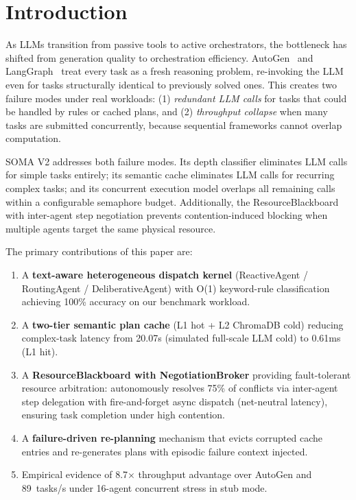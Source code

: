\documentclass[conference]{IEEEtran}
\begin{document}
\section{Introduction}

As LLMs transition from passive tools to active orchestrators, the bottleneck has shifted
from generation quality to orchestration efficiency. AutoGen~\cite{autogen} and
LangGraph~\cite{langgraph} treat every task as a fresh reasoning problem, re-invoking the
LLM even for tasks structurally identical to previously solved ones. This creates two
failure modes under real workloads: (1) \emph{redundant LLM calls} for tasks that could be
handled by rules or cached plans, and (2) \emph{throughput collapse} when many tasks are
submitted concurrently, because sequential frameworks cannot overlap computation.

SOMA V2 addresses both failure modes. Its depth classifier eliminates LLM calls for simple
tasks entirely; its semantic cache eliminates LLM calls for recurring complex tasks; and its
concurrent execution model overlaps all remaining calls within a configurable semaphore
budget. Additionally, the ResourceBlackboard with inter-agent step negotiation prevents
contention-induced blocking when multiple agents target the same physical resource.

The primary contributions of this paper are:
\begin{enumerate}
  \item A \textbf{text-aware heterogeneous dispatch kernel} (ReactiveAgent /
        RoutingAgent / DeliberativeAgent) with O(1) keyword-rule classification
        achieving 100\% accuracy on our benchmark workload.
  \item A \textbf{two-tier semantic plan cache} (L1 hot + L2 ChromaDB cold) reducing
        complex-task latency from 20.07s (simulated full-scale LLM cold) to 0.61ms (L1 hit).
  \item A \textbf{ResourceBlackboard with NegotiationBroker} providing fault-tolerant
        resource arbitration: autonomously resolves 75\% of conflicts via inter-agent
        step delegation with fire-and-forget async dispatch (net-neutral latency), ensuring task completion under high contention.
  \item A \textbf{failure-driven re-planning} mechanism that evicts corrupted cache
        entries and re-generates plans with episodic failure context injected.
  \item Empirical evidence of 8.7$\times$ throughput advantage over AutoGen and
        89~tasks/s under 16-agent concurrent stress in stub mode.
\end{enumerate}
\end{document}
